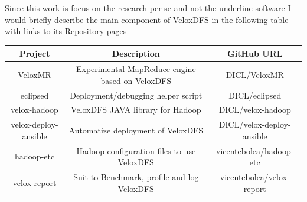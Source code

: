 Since this work is focus on the research per se and not the underline software I would briefly describe the main component of 
VeloxDFS in the following table with links to its Repository pages 

\begin{table}
\footnotesize{}
\centering
\begin{tabular}{ |c|c|c| } 
 \hline
Project                               & Description                  & GitHub URL  \\
 \hline
VeloxMR           &  Experimental MapReduce engine based on VeloxDFS & DICL/VeloxMR \\
 \hline
eclipsed          & Deployment/debugging helper script & DICL/eclipsed \\
 \hline
velox-hadoop      & VeloxDFS JAVA library for Hadoop                 & DICL/velox-hadoop \\
 \hline
velox-deploy-ansible & Automatize deployment of VeloxDFS & DICL/velox-deploy-ansible \\
 \hline
hadoop-etc        & Hadoop configuration files to use VeloxDFS       & vicentebolea/hadoop-etc \\
 \hline
velox-report      & Suit to Benchmark, profile and log VeloxDFS & vicentebolea/velox-report \\
 \hline
\end{tabular}
\label{tab:ecosystem}
\end{table}